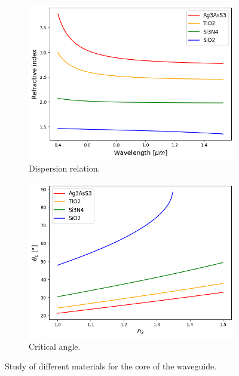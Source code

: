 \documentclass[a4paper,12pt]{article}
\begin{document}
\begin{figure}[H]
    \centering
    \begin{subfigure}{0.45\textwidth}
        \centering
        \includegraphics[scale=0.45]{dispersion_relation.png}
        \caption{Dispersion relation.}
        \label{fig:ri_dispersion}
    \end{subfigure}
    \hfill
    \begin{subfigure}{0.45\textwidth}
        \centering
        \includegraphics[scale=0.45]{critical_angle_vs_refractive_index.png}
        \caption{Critical angle.}
        \label{fig:critical_angle}
    \end{subfigure}
    \caption{Study of different materials for the core of the waveguide.}
\end{figure}
\end{document}
